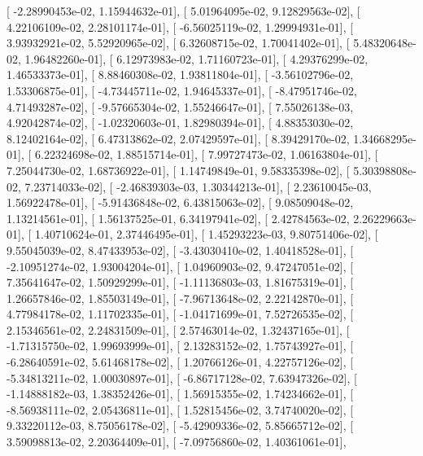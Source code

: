 \documentclass{article}
\begin{document}
       [ -2.28990453e-02,   1.15944632e-01],
       [  5.01964095e-02,   9.12829563e-02],
       [  4.22106109e-02,   2.28101174e-01],
       [ -6.56025119e-02,   1.29994931e-01],
       [  3.93932921e-02,   5.52920965e-02],
       [  6.32608715e-02,   1.70041402e-01],
       [  5.48320648e-02,   1.96482260e-01],
       [  6.12973983e-02,   1.71160723e-01],
       [  4.29376299e-02,   1.46533373e-01],
       [  8.88460308e-02,   1.93811804e-01],
       [ -3.56102796e-02,   1.53306875e-01],
       [ -4.73445711e-02,   1.94645337e-01],
       [ -8.47951746e-02,   4.71493287e-02],
       [ -9.57665304e-02,   1.55246647e-01],
       [  7.55026138e-03,   4.92042874e-02],
       [ -1.02320603e-01,   1.82980394e-01],
       [  4.88353030e-02,   8.12402164e-02],
       [  6.47313862e-02,   2.07429597e-01],
       [  8.39429170e-02,   1.34668295e-01],
       [  6.22324698e-02,   1.88515714e-01],
       [  7.99727473e-02,   1.06163804e-01],
       [  7.25044730e-02,   1.68736922e-01],
       [  1.14749849e-01,   9.58335398e-02],
       [  5.30398808e-02,   7.23714033e-02],
       [ -2.46839303e-03,   1.30344213e-01],
       [  2.23610045e-03,   1.56922478e-01],
       [ -5.91436848e-02,   6.43815063e-02],
       [  9.08509048e-02,   1.13214561e-01],
       [  1.56137525e-01,   6.34197941e-02],
       [  2.42784563e-02,   2.26229663e-01],
       [  1.40710624e-01,   2.37446495e-01],
       [  1.45293223e-03,   9.80751406e-02],
       [  9.55045039e-02,   8.47433953e-02],
       [ -3.43030410e-02,   1.40418528e-01],
       [ -2.10951274e-02,   1.93004204e-01],
       [  1.04960903e-02,   9.47247051e-02],
       [  7.35641647e-02,   1.50929299e-01],
       [ -1.11136803e-03,   1.81675319e-01],
       [  1.26657846e-02,   1.85503149e-01],
       [ -7.96713648e-02,   2.22142870e-01],
       [  4.77984178e-02,   1.11702335e-01],
       [ -1.04171699e-01,   7.52726535e-02],
       [  2.15346561e-02,   2.24831509e-01],
       [  2.57463014e-02,   1.32437165e-01],
       [ -1.71315750e-02,   1.99693999e-01],
       [  2.13283152e-02,   1.75743927e-01],
       [ -6.28640591e-02,   5.61468178e-02],
       [  1.20766126e-01,   4.22757126e-02],
       [ -5.34813211e-02,   1.00030897e-01],
       [ -6.86717128e-02,   7.63947326e-02],
       [ -1.14888182e-03,   1.38352426e-01],
       [  1.56915355e-02,   1.74234662e-01],
       [ -8.56938111e-02,   2.05436811e-01],
       [  1.52815456e-02,   3.74740020e-02],
       [  9.33220112e-03,   8.75056178e-02],
       [ -5.42909336e-02,   5.85665712e-02],
       [  3.59098813e-02,   2.20364409e-01],
       [ -7.09756860e-02,   1.40361061e-01],
\end{document}
